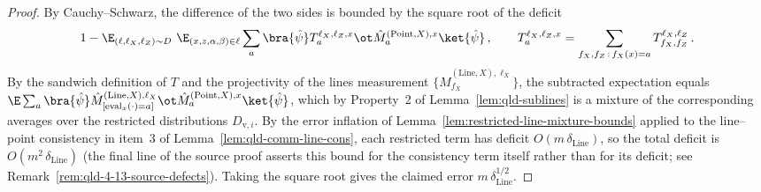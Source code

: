 \begin{proof}
	By Cauchy--Schwarz, the difference of the two sides is bounded by the
	square root of the deficit
	\[
		1 - \E_{(\ell,\ell_X,\ell_Z) \sim D}\
		\E_{(x,z,\alpha,\beta) \in \ell} \sum_{a}
		\bra{\hat\psi}
		T^{\ell_X,\ell_Z,x}_{a} \ot
		\hat{M}^{(\mathrm{Point},X),x}_{a}
		\ket{\hat\psi}\,,
		\qquad
		T^{\ell_X,\ell_Z,x}_{a}
		= \sum_{f_X,f_Z \,:\, f_X(x)=a}
		T^{\ell_X,\ell_Z}_{f_X,f_Z}\,.
	\]
	By the sandwich definition of $T$ and the projectivity of the lines
	measurement $\{\hat{M}^{(\mathrm{Line},X),\ell_X}_{f_X}\}$, the
	subtracted expectation equals
	$\E \sum_a \bra{\hat\psi}
	\hat{M}^{(\mathrm{Line},X),\ell_X}_{[\mathrm{eval}_x(\cdot)=a]} \ot
	\hat{M}^{(\mathrm{Point},X),x}_{a} \ket{\hat\psi}$,
	which by Property~2 of Lemma~\ref{lem:qld-sublines} is a mixture of the
	corresponding averages over the restricted distributions
	$D_{\mathrm{v},i}$. By the error inflation of
	Lemma~\ref{lem:restricted-line-mixture-bounds} applied to the
	line--point consistency in item~3 of Lemma~\ref{lem:qld-comm-line-cons},
	each restricted term has deficit $O(m\,\delta_{\mathrm{Line}})$, so the
	total deficit is $O(m^2\,\delta_{\mathrm{Line}})$ (the final line of the
	source proof asserts this bound for the consistency term itself rather
	than for its deficit; see Remark~\ref{rem:qld-4-13-source-defects}).
	Taking the square root gives the claimed error
	$m\,\delta_{\mathrm{Line}}^{1/2}$.
\end{proof}

